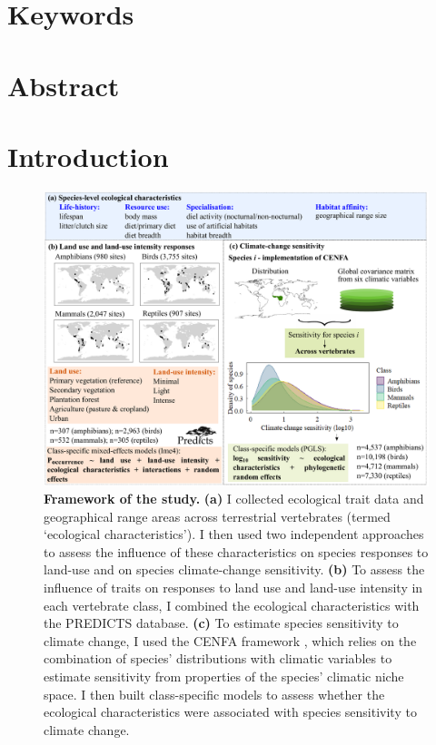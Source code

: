 
\section*{Keywords}

\section*{Abstract}

\section{Introduction}


\begin{figure}[h!]
\centering
\includegraphics[scale=0.55]{figures/Chapter4/Figure1}
\caption[Framework of the study]{\textbf{Framework of the study.} \textbf{(a)} I collected ecological trait data and geographical range areas across terrestrial vertebrates (termed `ecological characteristics'). I then used two independent approaches to assess the influence of these characteristics on species responses to land-use and on species climate-change  sensitivity. \textbf{(b)} To assess the influence of traits on responses to land use and land-use intensity in each vertebrate class, I combined the ecological characteristics with the PREDICTS database. \textbf{(c)} To estimate species sensitivity to climate change, I used the CENFA framework \citep{Rinnan2019}, which relies on the combination of species’ distributions with climatic variables to estimate sensitivity from properties of the species’ climatic niche space. I then built class-specific models to assess whether the ecological characteristics were associated with  species sensitivity to climate change.}
\label{chap4_fig1}
\end{figure}

